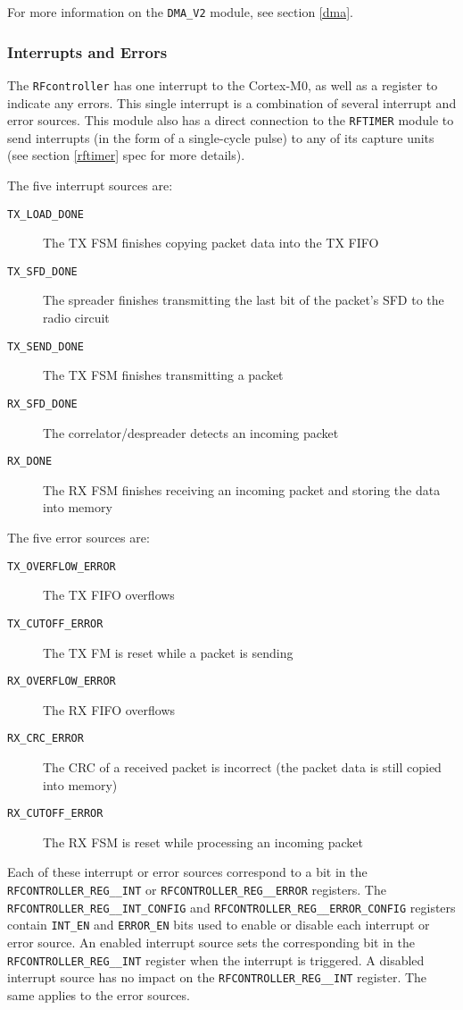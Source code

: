 For more information on the \texttt{DMA\_V2} module, see section \ref{dma}.

\subsubsection{Interrupts and Errors}
The \texttt{RFcontroller} has one interrupt to the Cortex-M0, as well as a register to indicate any errors. This single interrupt is a combination of several interrupt and error sources. This module also has a direct connection to the \texttt{RFTIMER} module to send interrupts (in the form of a single-cycle pulse) to any of its capture units (see section \ref{rftimer} spec for more details).

The five interrupt sources are:

\begin{description}
	\item[\texttt{TX\_LOAD\_DONE}] The TX FSM finishes copying packet data into the TX FIFO
	\item[\texttt{TX\_SFD\_DONE}] The spreader finishes transmitting the last bit of the packet’s SFD to the radio circuit
	\item[\texttt{TX\_SEND\_DONE}] The TX FSM finishes transmitting a packet
	\item[\texttt{RX\_SFD\_DONE}] The correlator/despreader detects an incoming packet
	\item[\texttt{RX\_DONE}] The RX FSM finishes receiving an incoming packet and storing the data into memory
\end{description}

The five error sources are:

\begin{description}
	\item[\texttt{TX\_OVERFLOW\_ERROR}] The TX FIFO overflows
	\item[\texttt{TX\_CUTOFF\_ERROR}] The TX FM is reset while a packet is sending
	\item[\texttt{RX\_OVERFLOW\_ERROR}] The RX FIFO overflows
	\item[\texttt{RX\_CRC\_ERROR}] The CRC of a received packet is incorrect (the packet data is still copied into memory)
	\item[\texttt{RX\_CUTOFF\_ERROR}] The RX FSM is reset while processing an incoming packet
\end{description}

Each of these interrupt or error sources correspond to a bit in the \texttt{RFCONTROLLER\-\_REG\_\_INT} or \texttt{RFCONTROLLER\_REG\_\_ERROR} registers. The \texttt{RFCONTROLLER\_REG\_\_INT\-\_CONFIG} and \texttt{RFCONTROLLER\_REG\_\_ERROR\_CONFIG} registers contain \texttt{INT\_EN} and \texttt{ER\-R\-OR\_EN} bits used to enable or disable each interrupt or error source. An enabled interrupt source sets the corresponding bit in the \texttt{RFCONTROLLER\_REG\_\_INT} register when the interrupt is triggered. A disabled interrupt source has no impact on the \texttt{RFCONTROLLER\_REG\_\_INT} register. The same applies to the error sources.

